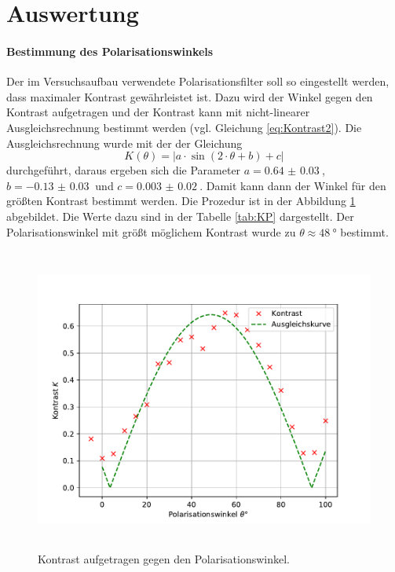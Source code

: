 \section{Auswertung}
\label{sec:Auswertung}
\paragraph{Bestimmung des Polarisationswinkels}
Der im Versuchsaufbau verwendete Polarisationsfilter soll so eingestellt werden, dass maximaler Kontrast 
gewährleistet ist. Dazu wird der Winkel gegen den Kontrast aufgetragen und der Kontrast kann mit nicht-linearer 
Ausgleichsrechnung bestimmt werden (vgl. Gleichung \eqref{eq:Kontrast2}). 
Die Ausgleichsrechnung wurde mit der der Gleichung 
\begin{equation*}
K(\theta) = \lvert a \cdot \sin( 2\cdot \theta + b) +c \rvert	
\end{equation*}
durchgeführt, daraus ergeben sich die Parameter $a = \SI{0.64(3)}{}$, $b = -\SI{0.13(3)}{}$ und 
$c = \SI{0.003(20)}{}$.
Damit kann dann der Winkel für den größten Kontrast bestimmt werden. Die 
Prozedur ist in der Abbildung \ref{fig:K} abgebildet. Die Werte dazu sind in der Tabelle \ref{tab:KP} 
dargestellt. Der Polarisationswinkel mit größt möglichem Kontrast 
wurde zu $\theta \approx \SI{48}{\degree}$ bestimmt.
\begin{figure}
  \centering
  \includegraphics[height = 10cm]{plots/Kontrastfit.pdf}
  \caption{Kontrast aufgetragen gegen den Polarisationswinkel.}
  \label{fig:K}
\end{figure}
